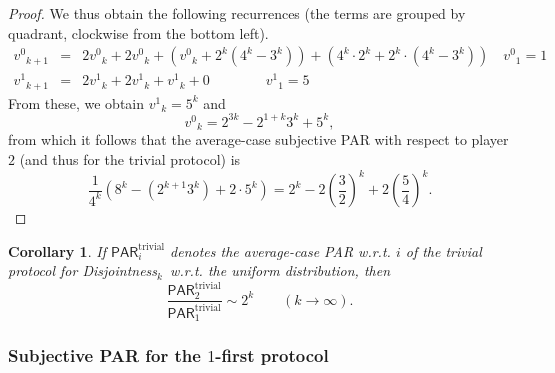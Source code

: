 \documentclass{article}
\theoremstyle{theorem}
\newtheorem{cor}[theorem]{Corollary}
\theoremstyle{definition}
\theoremstyle{remark}
\newcommand{\PAR}{\ensuremath{\mathsf{PAR}}}
\newcommand{\disjoint}{{\sc Dis\-joint\-ness}\ensuremath{_k}}
\newcommand{\svn}{\ensuremath{v^0}}
\newcommand{\svy}{\ensuremath{v^1}}
\begin{document}
\begin{proof}
We thus obtain the following recurrences (the terms are grouped by quadrant, clockwise from the bottom left).
\begin{eqnarray*}
\svn_{k+1} &=& 2\svn_k + 2\svn_k + \left(\svn_k + 2^k(4^k-3^k)\right) + \left(4^k\cdot 2^k + 2^k\cdot(4^k - 3^k)\right)\quad \svn_1 = 1\\
\svy_{k+1} &=& 2\svy_k + 2\svy_k + \svy_k + 0\qquad\qquad \svy_1 = 5
\end{eqnarray*}
From these, we obtain $\svy_k = 5^k$ and
\[
\svn_{k} = 2^{3k} - 2^{1 + k}3^k + 5^k,
\]
from which it follows that the average-case subjective PAR with respect to player $2$ (and thus for the trivial protocol) is
\[
\frac{1}{4^k}(8^k -(2^{k+1}3^k) + 2\cdot 5^k) = 2^k -2\left(\frac{3}{2}\right)^k + 2\left(\frac{5}{4}\right)^k.
\]
\end{proof}

\begin{cor}
If $\PAR^\mathrm{trivial}_i$ denotes the average-case PAR w.r.t. $i$ of the trivial protocol for \disjoint\ w.r.t. the uniform distribution, then
\[
\frac{\PAR^\mathrm{trivial}_2}{\PAR^\mathrm{trivial}_1} \sim 2^k\qquad (k\rightarrow\infty).
\]
\end{cor}

\subsubsection{Subjective PAR for the $1$-first protocol}
\end{document}
